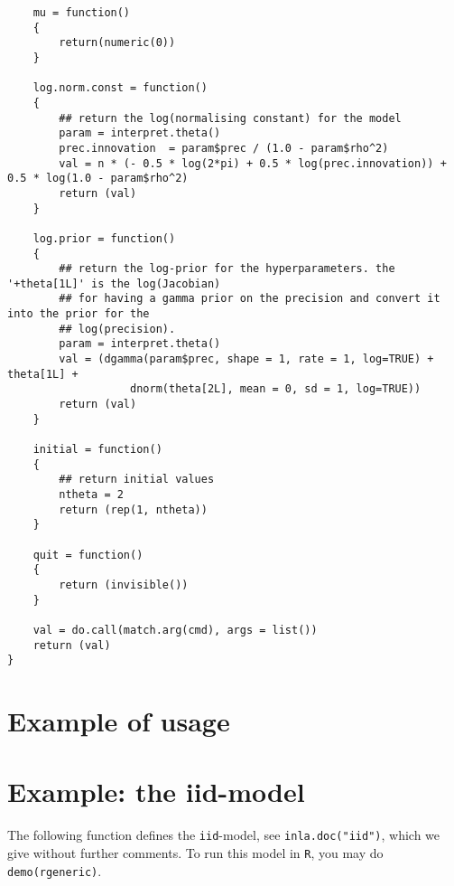 \documentclass[a4paper,11pt]{article}
\begin{document}
{\begin{verbatim}
    mu = function()
    {
        return(numeric(0))
    }

    log.norm.const = function()
    {
        ## return the log(normalising constant) for the model
        param = interpret.theta()
        prec.innovation  = param$prec / (1.0 - param$rho^2)
        val = n * (- 0.5 * log(2*pi) + 0.5 * log(prec.innovation)) + 0.5 * log(1.0 - param$rho^2)
        return (val)
    }

    log.prior = function()
    {
        ## return the log-prior for the hyperparameters. the '+theta[1L]' is the log(Jacobian)
        ## for having a gamma prior on the precision and convert it into the prior for the
        ## log(precision).
        param = interpret.theta()
        val = (dgamma(param$prec, shape = 1, rate = 1, log=TRUE) + theta[1L] + 
                   dnorm(theta[2L], mean = 0, sd = 1, log=TRUE))
        return (val)
    }

    initial = function()
    {
        ## return initial values
        ntheta = 2
        return (rep(1, ntheta))
    }

    quit = function()
    {
        return (invisible())
    }

    val = do.call(match.arg(cmd), args = list())
    return (val)
}
\end{verbatim}
}

\section*{Example of usage}

{\small

}

\clearpage

\section*{Example: the iid-model}

The following function defines the \texttt{iid}-model, see
\texttt{inla.doc("iid")}, which we give without further comments. To
run this model in \texttt{R}, you may do \texttt{demo(rgeneric)}.
\end{document}
